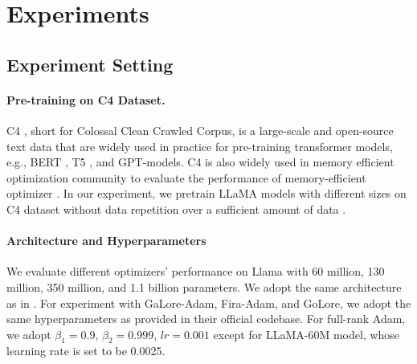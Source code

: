 \section{Experiments\label{sec:experiments}}
\subsection{Experiment Setting}
\paragraph{Pre-training on C4 Dataset.}
C4 \cite{raffel2020c4}, short for Colossal Clean Crawled Corpus, is a large-scale and open-source text data that are widely used in practice for pre-training transformer models, e.g., BERT \cite{portes2023mosaicbert}, T5 \cite{xue2020mt5}, and GPT-models. C4 is also widely used in memory efficient optimization community to evaluate the performance of memory-efficient optimizer \cite{hao2024flora, zhao2024galore, zhang2024q-galore, he2024subspace}. In our experiment, we pretrain LLaMA models with different sizes on C4 dataset without data repetition over a sufficient amount of data \cite{hoffmann2022scalinglaw}. 

\paragraph{Architecture and Hyperparameters} 
We evaluate different optimizers' performance on Llama with 60 million, 130 million, 350 million, and 1.1 billion parameters. We adopt the same architecture as in \cite{zhao2024galore}. For experiment with GaLore-Adam, Fira-Adam, and GoLore, we adopt the same hyperparameters as provided in their official codebase. For full-rank Adam, we adopt $\beta_1=0.9$, $\beta_2=0.999$, $lr=0.001$ except for LLaMA-60M model, whose learning rate is set to be 0.0025. 

